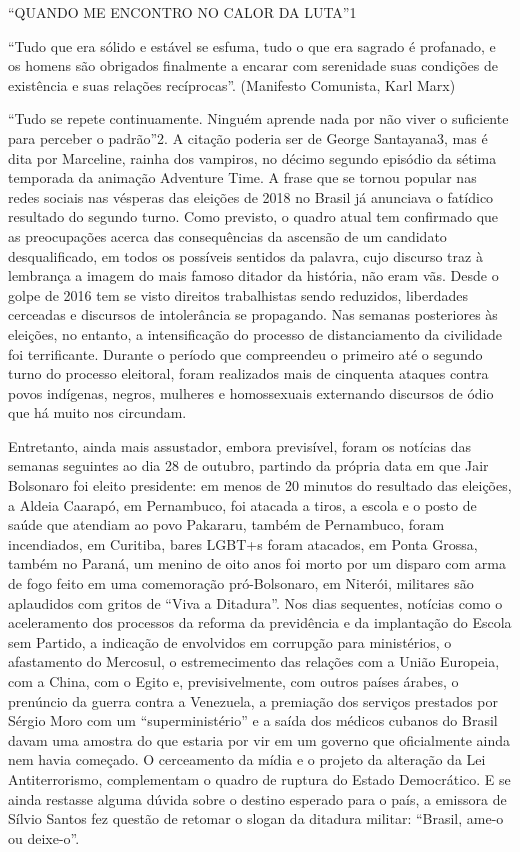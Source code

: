 \documentclass[../DISSERTACAO_MAIN.tex]{subfiles}
\begin{document}
“QUANDO ME ENCONTRO NO CALOR DA LUTA”1

“Tudo que era sólido e estável se esfuma, tudo o
que era sagrado é profanado, e os homens são obrigados finalmente a encarar
com serenidade suas condições de existência e suas relações recíprocas”.
(Manifesto Comunista, Karl Marx)





“Tudo se repete continuamente. Ninguém aprende nada por não viver o suficiente para perceber o padrão”2. A citação poderia ser de George Santayana3, mas é dita por Marceline, rainha dos vampiros, no décimo segundo episódio da sétima temporada da animação Adventure Time. A frase que se tornou popular nas redes sociais nas vésperas das eleições de 2018 no Brasil já anunciava o fatídico resultado do segundo turno. Como previsto, o quadro atual tem confirmado que as preocupações acerca das consequências da ascensão de um candidato desqualificado, em todos os possíveis sentidos da palavra, cujo discurso traz à lembrança a imagem do mais famoso ditador da história, não eram vãs. Desde o golpe de 2016 tem se visto direitos trabalhistas sendo reduzidos, liberdades cerceadas e discursos de intolerância se propagando. Nas semanas posteriores às eleições, no entanto, a intensificação do processo de distanciamento da civilidade foi terrificante. Durante o período que compreendeu o primeiro até o segundo turno do processo eleitoral, foram realizados mais de cinquenta ataques contra povos indígenas, negros, mulheres e homossexuais externando discursos de ódio que há muito nos circundam.

Entretanto, ainda mais assustador, embora previsível, foram os notícias das semanas seguintes ao dia 28 de outubro, partindo da própria data em que Jair Bolsonaro foi eleito presidente: em menos de 20 minutos do resultado das eleições, a Aldeia Caarapó, em Pernambuco, foi atacada a tiros, a escola e o posto de saúde que atendiam ao povo Pakararu, também de Pernambuco, foram incendiados, em Curitiba, bares LGBT+s foram atacados, em Ponta Grossa, também no Paraná, um menino de oito anos foi morto por um disparo com arma de fogo feito em uma comemoração pró-Bolsonaro, em Niterói, militares são aplaudidos com gritos de “Viva a Ditadura”. Nos dias sequentes, notícias como o aceleramento dos processos da reforma da previdência e da implantação do Escola sem Partido, a indicação de envolvidos em corrupção para ministérios, o afastamento do Mercosul, o estremecimento das relações com a União Europeia, com a China, com o Egito e, previsivelmente, com outros países árabes, o prenúncio da guerra contra a Venezuela, a premiação dos serviços prestados por Sérgio Moro com um “superministério” e a saída dos médicos cubanos do Brasil davam uma amostra do que estaria por vir em um governo que oficialmente ainda nem havia começado. O cerceamento da mídia e o projeto da alteração da Lei Antiterrorismo, complementam o quadro de ruptura do Estado Democrático. E se ainda restasse alguma dúvida sobre o destino esperado para o país, a emissora de Sílvio Santos fez questão de retomar o slogan da ditadura militar: “Brasil, ame-o ou deixe-o”.
\end{document}
